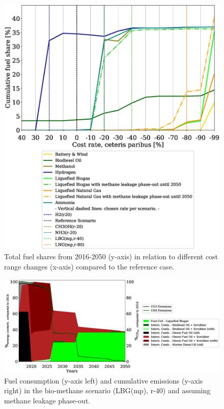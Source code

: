 \documentclass[article]{elsarticle}
\begin{document}
\begin{figure}[h]
    \centering
    \includegraphics[width=.825\textwidth]{figures/costVariation.eps}
    \caption{Total fuel shares from 2016-2050 (y-axis) in relation to different cost range changes (x-axis) compared to the reference case.}
    \label{fig:costVariation}
\end{figure}
\begin{figure}[h]
    \centering
    \includegraphics[width=\textwidth]{figures/LBG_MP_fuels_emissions.eps}
    \caption{Fuel consumption (y-axis left) and cumulative emissions (y-axis right) in the bio-methane scenario (LBG(mp), r-40) and assuming methane leakage phase-out.}
    \label{fig:LBG}
\end{figure}
\end{document}
